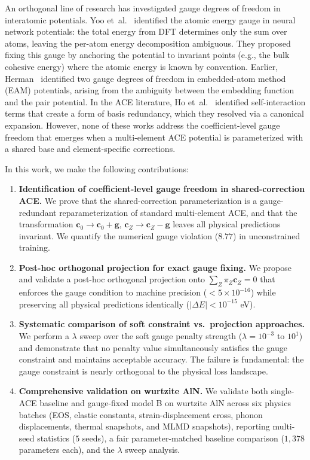 \documentclass[twoside,prb,aps,floatfix,superscriptaddress,longbibliography]{revtex4-2}
\begin{document}
An orthogonal line of research has investigated gauge degrees of freedom in interatomic potentials. Yoo et~al.~\cite{Yoo2019AtomicEnergyMapping} identified the atomic energy gauge in neural network potentials: the total energy from DFT determines only the sum over atoms, leaving the per-atom energy decomposition ambiguous. They proposed fixing this gauge by anchoring the potential to invariant points (e.g., the bulk cohesive energy) where the atomic energy is known by convention. Earlier, Herman~\cite{Herman2008EAMGauge} identified two gauge degrees of freedom in embedded-atom method (EAM) potentials, arising from the ambiguity between the embedding function and the pair potential. In the ACE literature, Ho et~al.~\cite{Ho2024ACESelfInteraction} identified self-interaction terms that create a form of basis redundancy, which they resolved via a canonical expansion. However, none of these works address the coefficient-level gauge freedom that emerges when a multi-element ACE potential is parameterized with a shared base and element-specific corrections.

In this work, we make the following contributions:

\begin{enumerate}[label=\textbf{(C\arabic*)}]
    \item \textbf{Identification of coefficient-level gauge freedom in shared-correction ACE.} We prove that the shared-correction parameterization is a gauge-redundant reparameterization of standard multi-element ACE, and that the transformation $\mathbf{c}_0 \to \mathbf{c}_0 + \mathbf{g}$, $\mathbf{c}_Z \to \mathbf{c}_Z - \mathbf{g}$ leaves all physical predictions invariant. We quantify the numerical gauge violation ($8.77$) in unconstrained training.
    \item \textbf{Post-hoc orthogonal projection for exact gauge fixing.} We propose and validate a post-hoc orthogonal projection onto $\sum_Z \pi_Z \mathbf{c}_Z = 0$ that enforces the gauge condition to machine precision ($< 5\times10^{-16}$) while preserving all physical predictions identically ($|\Delta E| < 10^{-15}$ eV).
    \item \textbf{Systematic comparison of soft constraint vs.\ projection approaches.} We perform a $\lambda$ sweep over the soft gauge penalty strength ($\lambda = 10^{-3}$ to $10^1$) and demonstrate that no penalty value simultaneously satisfies the gauge constraint and maintains acceptable accuracy. The failure is fundamental: the gauge constraint is nearly orthogonal to the physical loss landscape.
    \item \textbf{Comprehensive validation on wurtzite AlN.} We validate both single-ACE baseline and gauge-fixed model B on wurtzite AlN across six physics batches (EOS, elastic constants, strain-displacement cross, phonon displacements, thermal snapshots, and MLMD snapshots), reporting multi-seed statistics ($5$ seeds), a fair parameter-matched baseline comparison ($1{,}378$ parameters each), and the $\lambda$ sweep analysis.
\end{enumerate}
\end{document}
